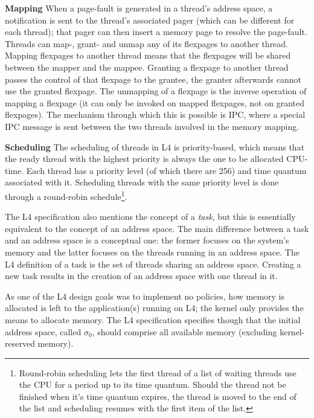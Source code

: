 \textbf{Mapping}
When a page-fault is generated in a thread's address space, a notification is sent to the thread's associated pager (which can be different for each thread); that pager can then insert a memory page to resolve the page-fault. Threads can map-, grant- and unmap any of its flexpages to another thread. Mapping flexpages to another thread means that the flexpages will be shared between the mapper and the mappee. Granting a flexpage to another thread passes the control of that flexpage to the grantee, the granter afterwards cannot use the granted flexpage. The unmapping of a flexpage is the inverse operation of mapping a flexpage (it can only be invoked on mapped flexpages, not on granted flexpages). The mechanism through which this is possible is IPC, where a special IPC message is sent between the two threads involved in the memory mapping.\emptyline

\textbf{Scheduling}
The scheduling of threads in L4 is priority-based, which means that the ready thread with the highest priority is always the one to be allocated CPU-time. Each thread has a priority level (of which there are 256) and time quantum associated with it. Scheduling threads with the same priority level is done through a round-robin schedule\footnote{Round-robin scheduling lets the first thread of a list of waiting threads use the CPU for a period up to its time quantum. Should the thread not be finished when it's time quantum expires, the thread is moved to the end of the list and scheduling resumes with the first item of the list.}.\emptyline

The L4 specification also mentions the concept of a \emph{task}, but this is essentially equivalent to the concept of an address space. The main difference between a task and an address space is a conceptual one: the former focuses on the system's memory and the latter focuses on the threads running in an address space. The L4 definition of a task is the set of threads sharing an address space. Creating a new task results in the creation of an address space with one thread in it.\emptyline

As one of the L4 design goals was to implement no policies, how memory is allocated is left to the application(s) running on L4; the kernel only provides the means to allocate memory. The L4 specification specifies though that the initial address space, called $\sigma_0$, should comprise all available memory (excluding kernel-reserved memory).


